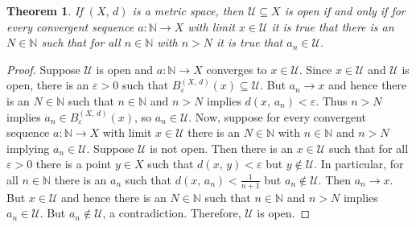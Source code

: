 \documentclass{article}
\theoremstyle{plain}
\newtheorem{theorem}{Theorem}[section]
\theoremstyle{normal}
\begin{document}
        \begin{theorem}
            If $(X,\,d)$ is a metric space, then $\mathcal{U}\subseteq{X}$ is
            open if and only if for every convergent sequence
            $a:\mathbb{N}\rightarrow{X}$ with limit $x\in\mathcal{U}$ it is
            true that there is an $N\in\mathbb{N}$ such that for all
            $n\in\mathbb{N}$ with $n>N$ it is true that $a_{n}\in\mathcal{U}$.
        \end{theorem}
        \begin{proof}
            Suppose $\mathcal{U}$ is open and $a:\mathbb{N}\rightarrow{X}$
            converges to $x\in\mathcal{U}$. Since $x\in\mathcal{U}$ and
            $\mathcal{U}$ is open, there is an $\varepsilon>0$ such that
            $B_{\varepsilon}^{(X,\,d)}(x)\subseteq\mathcal{U}$. But
            $a_{n}\rightarrow{x}$ and hence there is an $N\in\mathbb{N}$
            such that $n\in\mathbb{N}$ and $n>N$ implies
            $d(x,\,a_{n})<\varepsilon$. Thus $n>N$ implies
            $a_{n}\in{B}_{\varepsilon}^{(X,\,d)}(x)$, so
            $a_{n}\in\mathcal{U}$. Now, suppose for every convergent sequence
            $a:\mathbb{N}\rightarrow{X}$ with limit $x\in\mathcal{U}$ there is
            an $N\in\mathbb{N}$ with $n\in\mathbb{N}$ and $n>N$ implying
            $a_{n}\in\mathcal{U}$. Suppose $\mathcal{U}$ is not open.
            Then there is an $x\in\mathcal{U}$ such that for all
            $\varepsilon>0$ there is a point $y\in{X}$ such that
            $d(x,\,y)<\varepsilon$ but $y\notin\mathcal{U}$. In particular,
            for all $n\in\mathbb{N}$ there is an $a_{n}$ such that
            $d(x,\,a_{n})<\frac{1}{n+1}$ but $a_{n}\notin\mathcal{U}$.
            Then $a_{n}\rightarrow{x}$. But $x\in\mathcal{U}$ and hence there
            is an $N\in\mathbb{N}$ such that $n\in\mathbb{N}$ and $n>N$ implies
            $a_{n}\in\mathcal{U}$. But $a_{n}\notin\mathcal{U}$, a
            contradiction. Therefore, $\mathcal{U}$ is open.
        \end{proof}
\end{document}

